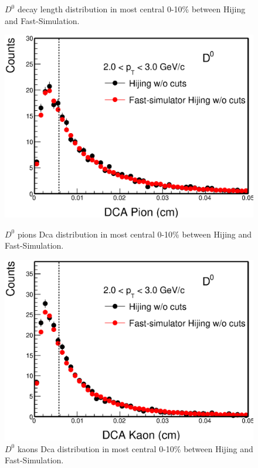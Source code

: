 \begin{figure}[htbp]
\begin{minipage}[htbp]{0.52\linewidth}
\caption{ $D^0$ decay length distribution in most central 0-10\% between Hijing and Fast-Simulation.\label{HijingDecayL}}
\end{minipage}
\end{figure}

\begin{figure}[htbp]
\begin{minipage}[htbp]{0.52\linewidth}
\centering
\includegraphics[width=1.0\textwidth,angle=0]{figure/Run14_D0HFT/HijingdcaPions.eps}
\caption{ $D^0$ pions Dca distribution in most central 0-10\% between Hijing and Fast-Simulation.\label{HijingdcaPions}}
\end{minipage}
\hfill
\begin{minipage}[htbp]{0.52\linewidth}
\centering
\includegraphics[width=1.0\textwidth,angle=0]{figure/Run14_D0HFT/HijingdcaKaons.eps} 
\caption{ $D^0$ kaons Dca distribution in most central 0-10\% between Hijing and Fast-Simulation.\label{HijingdcaKaons}}
\end{minipage}
\end{figure}

